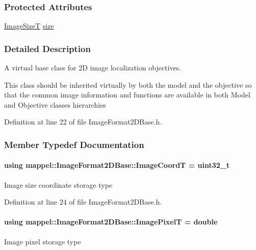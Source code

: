 \subsubsection*{Protected Attributes}
\begin{DoxyCompactItemize}
\item 
\hyperlink{classmappel_1_1ImageFormat2DBase_a49cccf61eb2a768a202634d27fcd81d5}{Image\+SizeT} \hyperlink{classmappel_1_1ImageFormat2DBase_a3be77d2aa6ec9f3815322732950c2a60}{size}
\end{DoxyCompactItemize}


\subsubsection{Detailed Description}
A virtual base class for 2D image localization objectives. 

This class should be inherited virtually by both the model and the objective so that the common image information and functions are available in both Model and Objective classes hierarchies 

Definition at line 22 of file Image\+Format2\+D\+Base.\+h.



\subsubsection{Member Typedef Documentation}
\paragraph[{\texorpdfstring{Image\+CoordT}{ImageCoordT}}]{\setlength{\rightskip}{0pt plus 5cm}using {\bf mappel\+::\+Image\+Format2\+D\+Base\+::\+Image\+CoordT} =  uint32\+\_\+t}\hypertarget{classmappel_1_1ImageFormat2DBase_a45e9234d63c357f34ca56c72c12b9e9c}{}\label{classmappel_1_1ImageFormat2DBase_a45e9234d63c357f34ca56c72c12b9e9c}
Image size coordinate storage type 

Definition at line 24 of file Image\+Format2\+D\+Base.\+h.

\paragraph[{\texorpdfstring{Image\+PixelT}{ImagePixelT}}]{\setlength{\rightskip}{0pt plus 5cm}using {\bf mappel\+::\+Image\+Format2\+D\+Base\+::\+Image\+PixelT} =  double}\hypertarget{classmappel_1_1ImageFormat2DBase_af6bae6f78398ab1eacb39726a05adeef}{}\label{classmappel_1_1ImageFormat2DBase_af6bae6f78398ab1eacb39726a05adeef}
Image pixel storage type 

